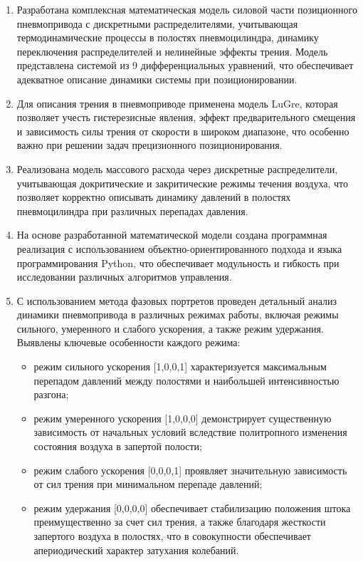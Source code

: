\begin{enumerate}
    \item Разработана комплексная математическая модель силовой части
    позиционного пневмопривода с дискретными распределителями,
    учитывающая термодинамические процессы в полостях пневмоцилиндра,
    динамику переключения распределителей и нелинейные эффекты трения.
    Модель представлена системой из 9 дифференциальных уравнений, что
    обеспечивает адекватное описание динамики системы при позиционировании.

    \item Для описания трения в пневмоприводе применена модель LuGre,
    которая позволяет учесть гистерезисные явления, эффект предварительного
    смещения и зависимость силы трения от скорости в широком диапазоне,
    что особенно важно при решении задач прецизионного позиционирования.

    \item Реализована модель массового расхода через дискретные
    распределители, учитывающая докритические и закритические режимы течения
    воздуха, что позволяет корректно описывать динамику давлений в полостях пневмоцилиндра при различных перепадах давления.

    \item На основе разработанной математической модели создана программная
    реализация с использованием объектно-ориентированного подхода и языка
    программирования Python, что обеспечивает модульность и гибкость при
    исследовании различных алгоритмов управления.

    \item С использованием метода фазовых портретов проведен детальный
    анализ динамики пневмопривода в различных режимах работы, включая
    режимы сильного, умеренного и слабого ускорения, а также режим удержания. Выявлены ключевые особенности каждого режима:
    \begin{itemize}
        \item режим сильного ускорения [1,0,0,1] характеризуется максимальным
        перепадом давлений между полостями и наибольшей интенсивностью разгона;
        \item режим умеренного ускорения [1,0,0,0] демонстрирует существенную
        зависимость от начальных условий вследствие политропного изменения
        состояния воздуха в запертой полости;
        \item режим слабого ускорения [0,0,0,1] проявляет значительную
        зависимость от сил трения при минимальном перепаде давлений;
        \item режим удержания [0,0,0,0] обеспечивает стабилизацию положения
        штока преимущественно за счет сил трения, а также благодаря жесткости
        запертого воздуха в полостях, что в совокупности обеспечивает апериодический характер затухания колебаний.
    \end{itemize}


\end{enumerate}
